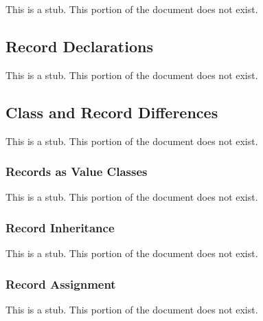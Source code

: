 \label{Records}

This is a stub.  This portion of the document does not exist.

\subsection{Record Declarations}
\label{Record_Declarations}

This is a stub.  This portion of the document does not exist.

\subsection{Class and Record Differences}
\label{Class_and_Record_Differences}

This is a stub.  This portion of the document does not exist.

\subsubsection{Records as Value Classes}
\label{Records_as_Value_Classes}

This is a stub.  This portion of the document does not exist.

\subsubsection{Record Inheritance}
\label{Record_Inheritance}

This is a stub.  This portion of the document does not exist.

\subsubsection{Record Assignment}
\label{Record_Assignment}

This is a stub.  This portion of the document does not exist.

